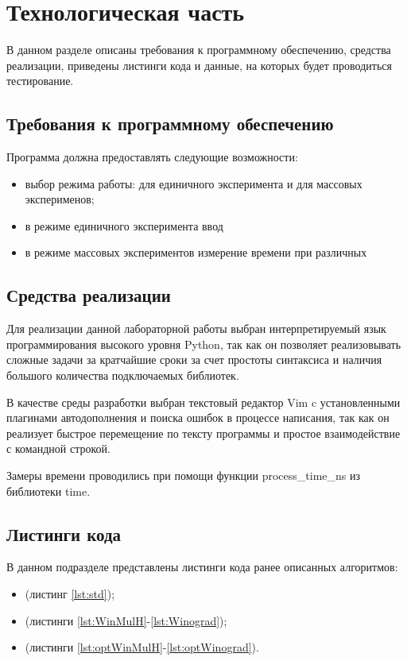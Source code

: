 \chapter{Технологическая часть}

В данном разделе описаны требования к программному обеспечению, средства
реализации, приведены листинги кода и данные, на которых будет проводиться
тестирование.

\section{Требования к программному обеспечению}

Программа должна предоставлять следующие возможности:
\begin{itemize}[left=\parindent]
    \item выбор режима работы: для единичного эксперимента и для массовых
          эксперименов;
    \item в режиме единичного эксперимента ввод %
    \item в режиме массовых экспериментов измерение времени при различных
\end{itemize}

\section{Средства реализации}

Для реализации данной лабораторной работы выбран интерпретируемый язык
программирования высокого уровня Python\cite{python}, так как он позволяет
реализовывать сложные задачи за кратчайшие сроки за счет простоты синтаксиса и
наличия большого количества подключаемых библиотек. 

В качестве среды разработки выбран текстовый редактор Vim\cite{vim} c
установленными плагинами автодополнения и поиска ошибок в процессе написания,
так как он реализует быстрое перемещение по тексту программы и простое
взаимодействие с командной строкой.

Замеры времени проводились при помощи функции process\_time\_ns из библиотеки
time\cite{time}.

\section{Листинги кода}

В данном подразделе представлены листинги кода ранее описанных алгоритмов:
\begin{itemize}[left=\parindent]
    \item (листинг \ref{lst:std});
    \item (листинги \ref{lst:WinMulH}-\ref{lst:Winograd});
    \item (листинги
          \ref{lst:optWinMulH}-\ref{lst:optWinograd}).
\end{itemize}

